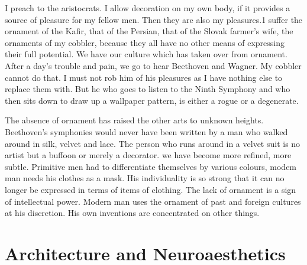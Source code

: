 \documentclass[a4paper]{article}
\begin{document}
I preach to the aristocrats. I allow decoration on my own body, if it provides a source of pleasure for my fellow men. Then they are also my pleasures.1 suffer the ornament of the Kafir, that of the Persian, that of the Slovak farmer’s wife, the ornaments of my cobbler, because they all have no other means of expressing their full potential. We have our culture which has taken over from ornament. After a day’s trouble and pain, we go to hear Beethoven and Wagner. My cobbler cannot do that. I must not rob him of his pleasures as I have nothing else to replace them with. But he who goes to listen to the Ninth Symphony and who then sits down to draw up a wallpaper pattern, is either a rogue or a degenerate.

The absence of ornament has raised the other arts to unknown heights. Beethoven’s symphonies would never have been written by a man who walked around in silk, velvet and lace. The person who runs around in a velvet suit is no artist but a buffoon or merely a decorator. we have become more refined, more subtle. Primitive men had to differentiate themselves by various colours, modem man needs his clothes as a mask. His individuality is so strong that it can no longer be expressed in terms of items of clothing. The lack of ornament is a sign of intellectual power. Modern man uses the ornament of past and foreign cultures at his discretion. His own inventions are concentrated on other things.

\clearpage
\section{Architecture and Neuroaesthetics}
\end{document}
